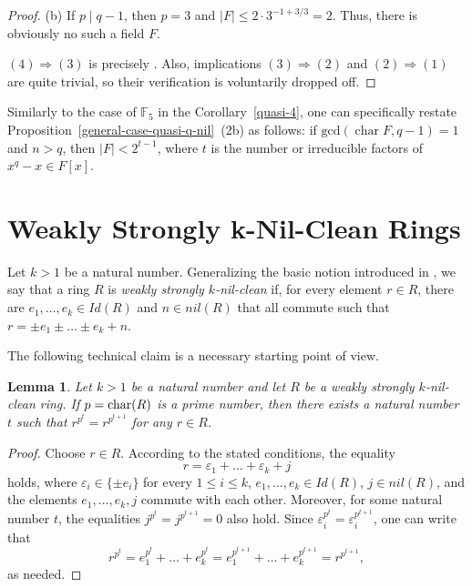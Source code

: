 \documentclass{amsart}
\DeclareMathOperator{\Char}{char}
\newtheorem{lemma}[theorem]{Lemma}
\theoremstyle{definition}
\theoremstyle{remark}
\numberwithin{equation}{section}
\begin{document}
\begin{proof}
\smallskip

(b) If $p \mid q-1$, then $p=3$ and $|F| \leq 2 \cdot 3^{-1 + 3/3} = 2$. Thus, there is obviously no such a field $F$.

\medskip

$(4) \Rightarrow (3)$ is precisely \cite[Theorem 2]{A17}. Also, implications $(3) \Rightarrow (2)$ and $(2) \Rightarrow (1)$ are quite trivial, so their verification is voluntarily dropped off.
\end{proof}

Similarly to the case of $\mathbb{F}_{5}$ in the Corollary~\ref{quasi-4}, one can specifically restate Proposition~\ref{general-case-quasi-q-nil}~(2b) as follows: if $\mathrm{gcd}(\Char F,q-1) = 1$ and $n > q$, then $|F| < 2^{t-1}$, where $t$ is the number or irreducible factors of $x^{q}-x \in F[x]$.

\section{\bf Weakly Strongly k-Nil-Clean Rings}

Let $k>1$ be a natural number. Generalizing the basic notion introduced in \cite{DM26}, we say that a ring $R$ is {\it weakly strongly $k$-nil-clean} if, for every element $r\in R$, there are $e_1,\ldots, e_k\in Id(R)$ and $n \in nil(R)$ that all commute such that $r = \pm e_1\pm \ldots \pm e_k + n$.

\medskip

The following technical claim is a necessary starting point of view.

\begin{lemma}\label{la1}
Let $k>1$ be a natural number and let $R$ be a weakly strongly $k$-nil-clean ring. If $p={\rm char}(R)$ is a prime number, then there exists a natural number $t$ such that $r^{p^{t}}=r^{p^{t+1}}$ for any $r \in R$.
\end{lemma}

\begin{proof} Choose $r\in R$. According to the stated conditions, the equality $$r= \varepsilon_1+ \ldots +\varepsilon_k + j$$ holds, where $\varepsilon_i\in \{\pm e_i\}$ for every $1\leq i\leq k$, $e_1,\ldots, e_k\in Id(R)$, $j \in nil(R)$, and the elements $e_1,\ldots, e_k, j$ commute with each other. Moreover, for some natural number $t$, the equalities $j^{p^{t}}=j^{p^{t+1}}=0$ also hold. Since $\varepsilon_i^{p^{t}}=\varepsilon_i^{p^{t+1}}$, one can write that $$r^{p^{t}}=e_1^{p^{t}}+\ldots+e_k^{p^{t}}=e_1^{p^{t+1}}+\ldots+e_k^{p^{t+1}}=r^{p^{t+1}},$$ as needed.
\end{proof}
\end{document}
